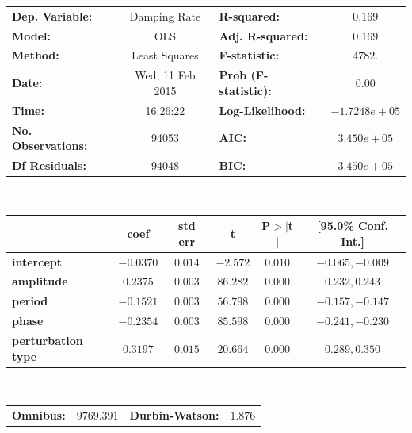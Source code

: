 \begin{table}
\begin{center}
\begin{tabular}{lclc}
\toprule
\textbf{Dep. Variable:}    &      Damping Rate       & \textbf{  R-squared:         } &$     0.169  $\\
\textbf{Model:}            &       OLS        & \textbf{  Adj. R-squared:    } &$     0.169  $\\
\textbf{Method:}           &  Least Squares   & \textbf{  F-statistic:       } &$     4782.  $\\
\textbf{Date:}             & Wed, 11 Feb 2015 & \textbf{  Prob (F-statistic):} &$     0.00   $\\
\textbf{Time:}             &     16:26:22     & \textbf{  Log-Likelihood:    } &$-1.7248e+05 $\\
\textbf{No. Observations:} &       94053      & \textbf{  AIC:               } &$ 3.450e+05  $\\
\textbf{Df Residuals:}     &       94048      & \textbf{  BIC:               } &$ 3.450e+05  $\\
\bottomrule
\end{tabular}\\[5ex]
\begin{tabular}{lccccc}\toprule
                   & \textbf{coef} & \textbf{std err} & \textbf{t} & \textbf{P$>$$|$t$|$} & \textbf{[95.0\% Conf. Int.]}  \\
\midrule
\textbf{intercept}     &     $-0.0370$ &       $0.014$    &   $-2.572$ &        $0.010$       &       $-0.065,  -0.009$      \\
\textbf{amplitude} &     $ 0.2375$ &       $0.003$    &   $86.282$ &        $0.000$       &       $ 0.232,   0.243$      \\
\textbf{period}    &     $-0.1521$ &       $0.003$    &   $56.798$ &        $0.000$       &       $-0.157,  -0.147$      \\
\textbf{phase}     &     $-0.2354$ &       $0.003$    &   $85.598$ &        $0.000$       &       $-0.241,  -0.230$      \\
\textbf{perturbation type}      &     $ 0.3197$ &       $0.015$    &   $20.664$ &        $0.000$       &       $ 0.289,   0.350$      \\
\bottomrule
\end{tabular}\\[5ex]
\begin{tabular}{lclc}\toprule
\textbf{Omnibus:}       &$9769.391$& \textbf{  Durbin-Watson:     } &$    1.876$ \\

\end{tabular}
\end{center}
\end{table}
